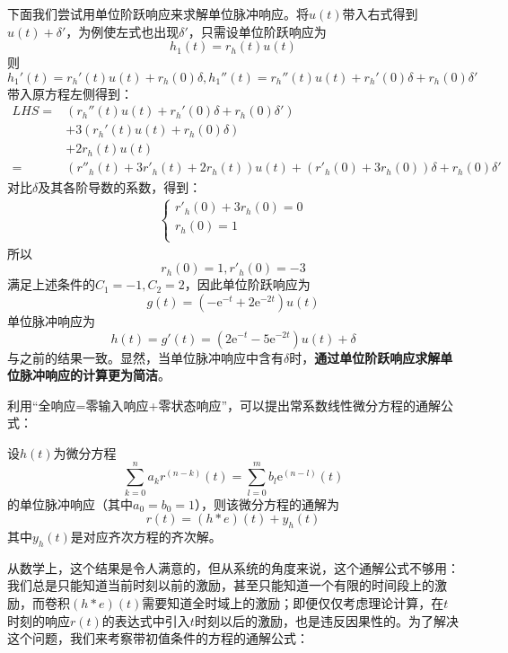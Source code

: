 \begin{example}
    下面我们尝试用单位阶跃响应来求解单位脉冲响应。将$u(t)$带入右式得到$u(t)+\delta'$，为例使左式也出现$\delta'$，只需设单位阶跃响应为
    $$h_1(t)=r_h(t)u(t)$$
    则
    $$h_1'(t)=r_h'(t)u(t)+r_h(0)\delta,h_1''(t)=r_h''(t)u(t)+r_h'(0)\delta+r_h(0)\delta'$$
    带入原方程左侧得到：\begin{align*}
        LHS=&\left(r_h''(t)u(t)+r_h'(0)\delta+r_h(0)\delta'\right)\\
        &+3\left(r_h'(t)u(t)+r_h(0)\delta\right)\\
        &+2r_h(t)u(t)\\
        =&\left(r''_h(t)+3r'_h(t)+2r_h(t)\right)u(t)+\left(r'_h(0)+3r_h(0)\right)\delta+r_h(0)\delta'
    \end{align*}
    对比$\delta$及其各阶导数的系数，得到：\begin{align*}
        \begin{cases}
            r'_h(0)+3r_h(0)=0\\
            r_h(0)=1\\
        \end{cases}
    \end{align*}
    所以$$r_h(0)=1,r'_h(0)=-3$$
    满足上述条件的$C_1=-1,C_2=2$，因此单位阶跃响应为
    $$g(t)=(-\mathrm{e}^{-t}+2\mathrm{e}^{-2t})u(t)$$
    单位脉冲响应为
    $$h(t)=g'(t)=\left(2\mathrm{e}^{-t}-5\mathrm{e}^{-2t}\right)u(t)+\delta$$
    与之前的结果一致。显然，当单位脉冲响应中含有$\delta$时，\textbf{通过单位阶跃响应求解单位脉冲响应的计算更为简洁}。
\end{example}

利用“全响应=零输入响应+零状态响应”，可以提出常系数线性微分方程的通解公式：
\begin{theorem}
    设$h(t)$为微分方程
    \[\sum_{k=0}^{n}a_{k} r^{(n-k)}(t)=\sum_{l=0}^{m}b_{l} \mathrm{e}^{(n-l)}(t)\]
    的单位脉冲响应（其中$a_0=b_0=1$），则该微分方程的通解为
    \[r(t)=(h*e)(t)+y_h(t)\]
    其中$y_h(t)$是对应齐次方程的齐次解。
\end{theorem}

从数学上，这个结果是令人满意的，但从系统的角度来说，这个通解公式不够用：我们总是只能知道当前时刻以前的激励，甚至只能知道一个有限的时间段上的激励，而卷积$(h*e)(t)$需要知道全时域上的激励；即便仅仅考虑理论计算，在$t$时刻的响应$r(t)$的表达式中引入$t$时刻以后的激励，也是违反因果性的。为了解决这个问题，我们来考察带初值条件的方程的通解公式：

